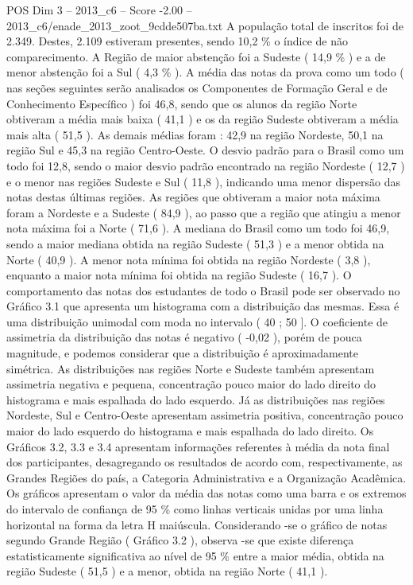 \begin{textsample}{POS Dim 3 – 2013\_c6 – Score -2.00 – 2013\_c6/enade\_2013\_zoot\_9cdde507ba.txt}
A população total de inscritos foi de 2.349.
Destes, 2.109 estiveram presentes, sendo 10,2 \% o índice de não comparecimento.
A Região de maior abstenção foi a Sudeste ( 14,9 \% ) e a de menor abstenção foi a Sul ( 4,3 \% ).
A média das notas da prova como um todo ( nas seções seguintes serão analisados os Componentes de Formação Geral e de Conhecimento Específico ) foi 46,8, sendo que os alunos da região Norte obtiveram a média mais baixa ( 41,1 ) e os da região Sudeste obtiveram a média mais alta ( 51,5 ).
As demais médias foram : 42,9 na região Nordeste, 50,1 na região Sul e 45,3 na região Centro-Oeste.
O desvio padrão para o Brasil como um todo foi 12,8, sendo o maior desvio padrão encontrado na região Nordeste ( 12,7 ) e o menor nas regiões Sudeste e Sul ( 11,8 ), indicando uma menor dispersão das notas destas últimas regiões.
As regiões que obtiveram a maior nota máxima foram a Nordeste e a Sudeste ( 84,9 ), ao passo que a região que atingiu a menor nota máxima foi a Norte ( 71,6 ).
A mediana do Brasil como um todo foi 46,9, sendo a maior mediana obtida na região Sudeste ( 51,3 ) e a menor obtida na Norte ( 40,9 ).
A menor nota mínima foi obtida na região Nordeste ( 3,8 ), enquanto a maior nota mínima foi obtida na região Sudeste ( 16,7 ).
O comportamento das notas dos estudantes de todo o Brasil pode ser observado no Gráfico 3.1 que apresenta um histograma com a distribuição das mesmas.
Essa é uma distribuição unimodal com moda no intervalo ( 40 ; 50 ].
O coeficiente de assimetria da distribuição das notas é negativo ( -0,02 ), porém de pouca magnitude, e podemos considerar que a distribuição é aproximadamente simétrica.
As distribuições nas regiões Norte e Sudeste também apresentam assimetria negativa e pequena, concentração pouco maior do lado direito do histograma e mais espalhada do lado esquerdo.
Já as distribuições nas regiões Nordeste, Sul e Centro-Oeste apresentam assimetria positiva, concentração pouco maior do lado esquerdo do histograma e mais espalhada do lado direito.
Os Gráficos 3.2, 3.3 e 3.4 apresentam informações referentes à média da nota final dos participantes, desagregando os resultados de acordo com, respectivamente, as Grandes Regiões do país, a Categoria Administrativa e a Organização Acadêmica.
Os gráficos apresentam o valor da média das notas como uma barra e os extremos do intervalo de confiança de 95 \% como linhas verticais unidas por uma linha horizontal na forma da letra H maiúscula.
Considerando -se o gráfico de notas segundo Grande Região ( Gráfico 3.2 ), observa -se que existe diferença estatisticamente significativa ao nível de 95 \% entre a maior média, obtida na região Sudeste ( 51,5 ) e a menor, obtida na região Norte ( 41,1 ).

\end{textsample}
